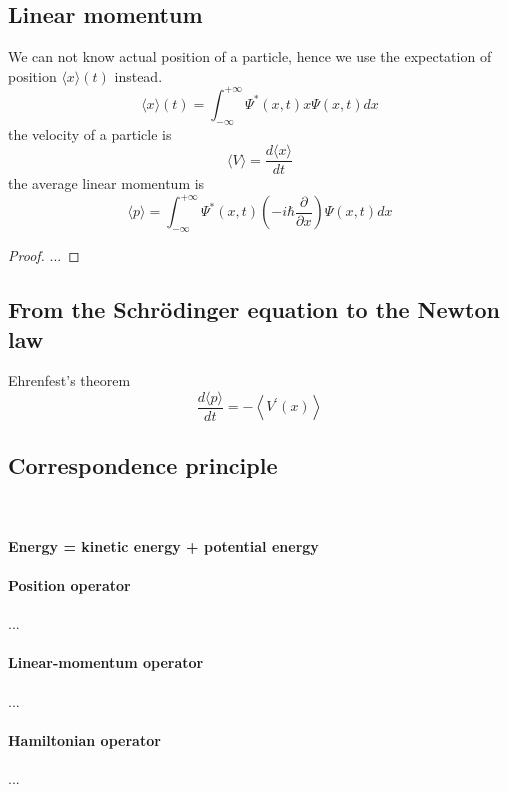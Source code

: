 \subsection{Linear momentum}
We can not know actual position of a particle, hence we use the expectation of position $\langle x\rangle(t)$ instead.
\begin{equation}\boxed{
        \langle x\rangle(t)=\int_{-\infty}^{+\infty}  \Psi^{*}(x, t) x \Psi(x, t) d x}\label{eq4}
\end{equation}
the velocity of a particle is
\begin{equation}\boxed{
        \langle V\rangle = \frac{d\langle x\rangle}{d t}}\label{eq5}
\end{equation}
the average linear momentum is
\begin{equation}\boxed{
        \langle p\rangle=\int_{-\infty}^{+\infty} \Psi^{*}(x, t)\left(-i \hbar \frac{\partial}{\partial x}\right) \Psi(x, t) d x}\label{eq6}
\end{equation}
\begin{proof}
    ...
\end{proof}

\subsection{From the Schrödinger equation to the Newton law}
Ehrenfest's theorem
\begin{equation}
    \frac{d\langle p\rangle}{d t}=-\left\langle V^{\prime}(x)\right\rangle
\end{equation}


\subsection{Correspondence principle}
\\
\\
\textbf{Energy = kinetic energy + potential energy}

\paragraph{Position operator}
...

\paragraph{Linear-momentum operator}
...

\paragraph{Hamiltonian operator}
...

